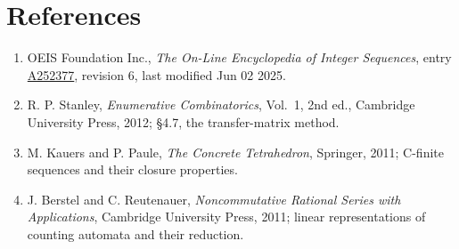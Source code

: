 \documentclass[11pt]{article}
\theoremstyle{definition}
\begin{document}
\section{References}

\begin{enumerate}

\item OEIS Foundation Inc., \emph{The On-Line Encyclopedia of Integer Sequences}, entry \href{https://oeis.org/A252377}{A252377}, revision 6, last modified Jun 02 2025.

\item R. P. Stanley, \emph{Enumerative Combinatorics}, Vol.~1, 2nd ed., Cambridge University Press, 2012; \S4.7, the transfer-matrix method.

\item M. Kauers and P. Paule, \emph{The Concrete Tetrahedron}, Springer, 2011; C-finite sequences and their closure properties.

\item J. Berstel and C. Reutenauer, \emph{Noncommutative Rational Series with Applications}, Cambridge University Press, 2011; linear representations of counting automata and their reduction.

\end{enumerate}
\end{document}
